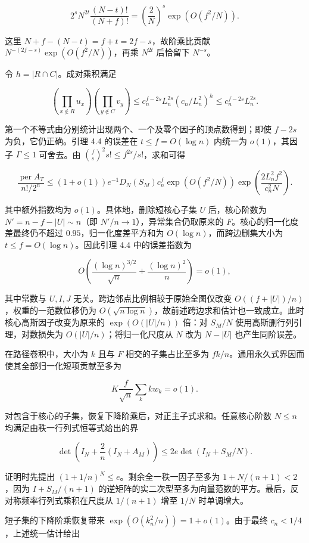 \documentclass[11pt,a4paper]{article}
\begin{document}
\[2^sN^{2t}\frac{(N-t)!}{(N+f)!}
=\left(\frac2N\right)^s\exp(O(f^2/N)).\]

这里 \(N+f-(N-t)=f+t=2f-s\)，故阶乘比贡献 \(N^{-(2f-s)}\exp(O(f^2/N))\)，再乘 \(N^{2t}\) 后恰留下 \(N^{-s}\)。

令 \(h=|R\cap C|\)。成对乘积满足

\[\left(\prod_{x\notin R}u_x\right)
\left(\prod_{y\notin C}v_y\right)
\le c_n^{f-2s}L_n^{2s}(c_n/L_n^2)^h
\le c_n^{f-2s}L_n^{2s}.\]

第一个不等式由分别统计出现两个、一个及零个因子的顶点数得到；即使 \(f-2s\) 为负，它仍正确。引理 4.4 的误差在 \(t\le f=O(\log n)\) 内统一为 \(o(1)\)，其因子 \(\Gamma\le1\) 可舍去。由 \(\binom fs^2s!\le f^{2s}/s!\)，求和可得

\[\frac{\operatorname{per}A_T}{n!/2^n}
\le(1+o(1))e^{-1}D_N(S_M)c_n^f
\exp(O(f^2/N))
\exp\left(\frac{2L_n^2f^2}{c_n^2N}\right).\]

其中额外指数均为 \(o(1)\)。具体地，删除短核心子集 \(U\) 后，核心阶数为 \(N'=n-f-|U|\sim n\)（即 \(N'/n\to1\)），异常集合仍取原来的 \(F\)。核心的归一化度差最终仍不超过 \(0.95\)，归一化度差平方和为 \(O(\log n)\)，而跨边删集大小为 \(t\le f=O(\log n)\)。因此引理 4.4 中的误差指数为

\[O\!\left(\frac{(\log n)^{3/2}}{\sqrt n}+\frac{(\log n)^2}{n}\right)=o(1),\]

其中常数与 \(U,I,J\) 无关。跨边邻点比例相较于原始全图仅改变 \(O((f+|U|)/n)\)，权重的一范数位移仍为 \(O(\sqrt{n\log n})\)，故前述跨边求和估计也一致成立。此时核心高斯因子改变为原来的 \(\exp(O(|U|/n))\) 倍：对 \(S_M/N\) 使用高斯删行列引理，对数损失为 \(O(|U|/n)\)；将归一化尺度从 \(N\) 改为 \(N-|U|\) 也产生同阶误差。

在路径卷积中，大小为 \(k\) 且与 \(F\) 相交的子集占比至多为 \(fk/n\)。通用永久式界因而使其全部归一化短项贡献至多为

\[K\frac f{\sqrt n}\sum_k kw_k=o(1).\]

对包含于核心的子集，恢复下降阶乘后，对正主子式求和。任意核心阶数 \(N\le n\) 均满足由秩一行列式恒等式给出的界

\[\det\left(I_N+\frac2n(I_N+A_M)\right)
\le2e\det(I_N+S_M/N).\]

证明时先提出 \((1+1/n)^N\le e\)。剩余全一秩一因子至多为 \(1+N/(n+1)<2\)，因为 \(I+S_M/(n+1)\) 的逆矩阵的实二次型至多为向量范数的平方。最后，反对称频率行列式乘积在尺度从 \(1/(n+1)\) 增至 \(1/N\) 时单调增大。

短子集的下降阶乘恢复带来 \(\exp(O(k_n^2/n))=1+o(1)\)。由于最终 \(c_n<1/4\)，上述统一估计给出
\end{document}
